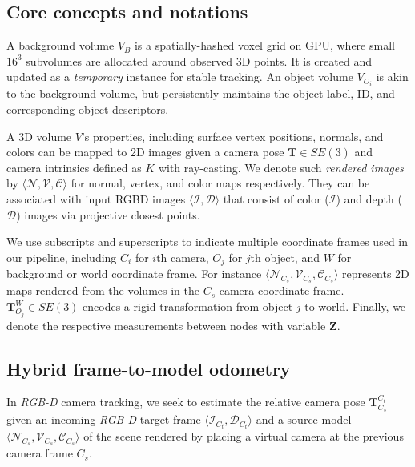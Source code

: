 \subsection{Core concepts and notations} \label{subsec: notation}
A background volume $V_B$ is a spatially-hashed voxel grid on GPU, where small $16^3$ subvolumes are allocated around observed 3D points. It is created and updated as a \textit{temporary} instance for stable tracking. An object volume $V_{O_i}$ is akin to the background volume, but persistently maintains the object label, ID, and corresponding object descriptors.

A 3D volume $V$'s properties, including surface vertex positions, normals, and colors can be mapped to 2D images given a camera pose $\mathbf{T} \in SE(3)$ and camera intrinsics defined as $K$ with ray-casting. We denote such \textit{rendered images} by \( \langle \mathcal{N}, \mathcal{V}, \mathcal{C} \rangle \)  for normal, vertex, and color maps respectively. They can be associated with input RGBD images $\langle \mathcal{I}, \mathcal{D}\rangle $ that consist of color ($\mathcal{I}$) and depth ($\mathcal{D}$) images via projective closest points.

We use subscripts and superscripts to indicate multiple coordinate frames used in our pipeline, including $C_i$ for $i$th camera, $O_j$ for $j$th object, and $W$ for background or world coordinate frame. For instance \(\langle \mathcal{N}_{C_s}, \mathcal{V}_{C_s}, \mathcal{C}_{C_s} \rangle \) represents 2D maps rendered from the volumes in the $C_s$ camera coordinate frame.
$\mathbf{T}_{O_j}^W \in SE(3)$ encodes a rigid transformation from object $j$ to world. Finally, we denote the respective measurements between nodes with variable $\mathbf{Z}$.

\subsection{Hybrid frame-to-model odometry} \label{subsec: tracking}

In \textit{RGB-D} camera tracking, we seek to estimate the relative camera pose \(\mathbf{T}^{C_t}_{C_s}\) given an incoming \textit{RGB-D} target frame \( \langle \mathcal{I}_{C_t}, \mathcal{D}_{C_t}\rangle \) and a source model \( \langle \mathcal{N}_{C_{s}}, \mathcal{V}_{C_{s}}, \mathcal{C}_{C_{s}}\rangle \) of the scene rendered by placing a virtual camera at the previous camera frame ${C_s}$.

